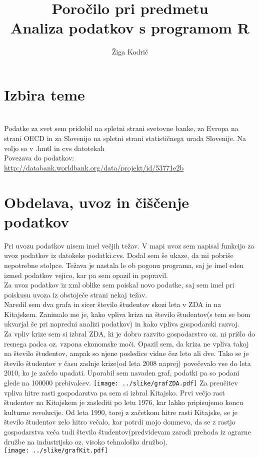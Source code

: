\documentclass[11pt,a4paper]{article}
\begin{document}
\title{Poročilo pri predmetu \\
Analiza podatkov s programom R}
\author{Žiga Kodrič}
\maketitle

\section{Izbira teme}

\\
Podatke za svet sem pridobil na spletni strani svetovne banke, za Evropa na strani OECD in za Slovenijo na spletni strani statističnega urada Slovenije. Na voljo so v .hmtl in cvs datotekah
\\
Povezava do podatkov: \url{http://databank.worldbank.org/data/projekt/id/53771e2b}
\section{Obdelava, uvoz in čiščenje podatkov}
Pri uvozu podatkov nisem imel večjih težav. V mapi uvoz sem napisal funkcijo za uvoz podatkov iz datokeke podatki.cvs. Dodal sem še ukaze, da mi pobriše nepotrebne stolpce. Težava je nastala le ob pogonu programa, saj je imel eden izmed podatkov vejico, kar pa sem opazil in popravil. \\
Za uvoz podatkov iz xml oblike sem poiskal novo podatke, saj sem imel pri poiskusu uvoza iz obstoječe strani nekaj težav. \\
Naredil sem dva grafa in sicer število študentov skozi leta v ZDA in na Kitajskem. Zanimalo me je, kako vpliva kriza na število študentov(s tem se bom ukvarjal še pri napredni analizi podatkov) in kako vpliva gospodarski razvoj.\\
Za vpliv krize sem si izbral ZDA, ki je dobro razvito gospodarstvo oz. ni prišlo do resnega padca oz. vzpona ekonomske moči. Opazil sem, da kriza ne vpliva takoj na število študentov, ampak so njene posledice vidne čez leto ali dve. Tako se je število študentov v času zadnje krize(od leta 2008 naprej) povečevalo vse do leta 2010, ko je začelo upadati. Uporabil sem navaden graf, podatki pa so podani glede na 100000 prebivalcev. 
\texttt{[image: ../slike/grafZDA.pdf]}
Za preučitev vpliva hitre rasti gospodarstva pa sem si izbral Kitajsko. Prvi večjo rast študentov na Kitajskem je zaslediti po letu 1976, kar lahko pripisujemo koncu kulturne revolucije. Od leta 1990, torej z začetkom hitre rasti Kitajske, se je število študentov zelo hitro večalo, kar potrdi mojo domnevo, da se z rastjo gospodarstva veča tudi število študentov(predvidevam zaradi prehoda iz agrarne družbe na industrijsko oz. visoko tehnološko družbo). \\
\texttt{[image: ../slike/grafKit.pdf]}
\end{document}
